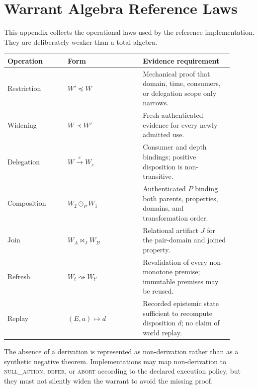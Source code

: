 \section{Warrant Algebra Reference Laws}
This appendix collects the operational laws used by the reference implementation. They are deliberately weaker than a total algebra.

\begin{center}
\begin{tabular}{p{0.24\linewidth}p{0.30\linewidth}p{0.36\linewidth}}
\toprule
Operation & Form & Evidence requirement \\
\midrule
Restriction & $W'\preceq W$ & Mechanical proof that domain, time, consumers, or delegation scope only narrows. \\
Widening & $W\prec W'$ & Fresh authenticated evidence for every newly admitted use. \\
Delegation & $W\xrightarrow{c}W_c$ & Consumer and depth bindings; positive disposition is non-transitive. \\
Composition & $W_2\odot_P W_1$ & Authenticated $P$ binding both parents, properties, domains, and transformation order. \\
Join & $W_A\Join_J W_B$ & Relational artifact $J$ for the pair-domain and joined property. \\
Refresh & $W_t\rightsquigarrow W_{t'}$ & Revalidation of every non-monotone premise; immutable premises may be reused. \\
Replay & $(E,a)\mapsto d$ & Recorded epistemic state sufficient to recompute disposition $d$; no claim of world replay. \\
\bottomrule
\end{tabular}
\end{center}

The absence of a derivation is represented as non-derivation rather than as a synthetic negative theorem. Implementations may map non-derivation to \textsc{null\_action}, \textsc{defer}, or \textsc{abort} according to the declared execution policy, but they must not silently widen the warrant to avoid the missing proof.
